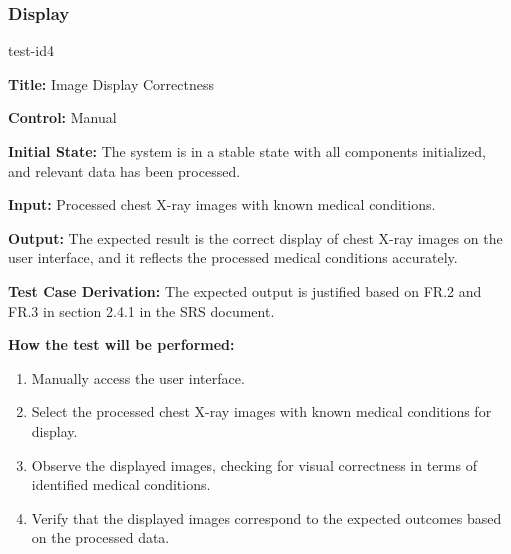 \documentclass[12pt, titlepage]{article}
\begin{document}
\subsubsection{Display}
\begin{itemize}
    \begin{item}
        test-id4
        \begin{mdframed}[linewidth=0.5mm]
            \textbf{Title:} Image Display Correctness \par
            \textbf{Control:} Manual \par
            \textbf{Initial State:} The system is in a stable state with all components initialized, and relevant data has been processed. \par
            \textbf{Input:} Processed chest X-ray images with known medical conditions. \par
            \textbf{Output:} The expected result is the correct display of chest X-ray images on the user interface, and it reflects the processed medical conditions accurately. \par
            \textbf{Test Case Derivation:} The expected output is justified based on FR.2 and FR.3 in section 2.4.1 in the SRS document. \par
            \textbf{How the test will be performed:}
            \begin{enumerate}[noitemsep]
                \item Manually access the user interface.
                \item Select the processed chest X-ray images with known medical conditions for display.
                \item Observe the displayed images, checking for visual correctness in terms of identified medical conditions.
                \item Verify that the displayed images correspond to the expected outcomes based on the processed data.
            \end{enumerate}
        \end{mdframed}
    \end{item}


\end{itemize}
\end{document}
